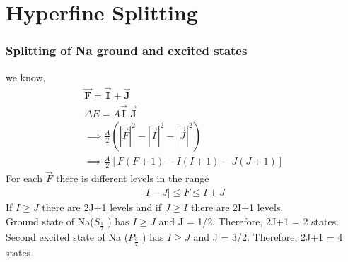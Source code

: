 \documentclass[11pt, a4paper]{article}
\begin{document}
 
    



%
\tableofcontents

\clearpage
\section{Hyperfine Splitting}
\subsubsection*{Splitting of Na ground and excited states}
we know,
\begin{gather}
    \vec{\mathbf{F} } = \vec{\mathbf{I} }+\vec{\mathbf{J}}\\
    \Delta E = A \vec{\mathbf{I} }.\vec{\mathbf{J}}\\
    \implies \frac{A}{2}\left(\left\vert \vec{F} \right\vert^2 -\left\vert \vec{I} \right\vert^2 -\left\vert \vec{J}\right\vert^2\right)\\
     \implies \frac{A}{2}[F(F+1)-I(I+1)-J(J+1)]
\end{gather}
For each \(\vec{F}\) there is different levels in the range
\begin{gather}
    \left\vert I-J \right\vert \leq F\leq I+J
\end{gather}
If \(I\geq J\) there are 2J+1 levels and if \(J\geq I\) there are 2I+1 levels. \\
Ground state of Na(\(S _ \frac{1}{2}\) ) has \(I\geq J\)  and J = 1/2. Therefore, 2J+1 = 2 states. \\
Second excited state of Na (\(P_ \frac{3}{2}\) ) has \(I \geq J\)  and J = 3/2. Therefore, 2J+1 = 4 states.
\end{document}
